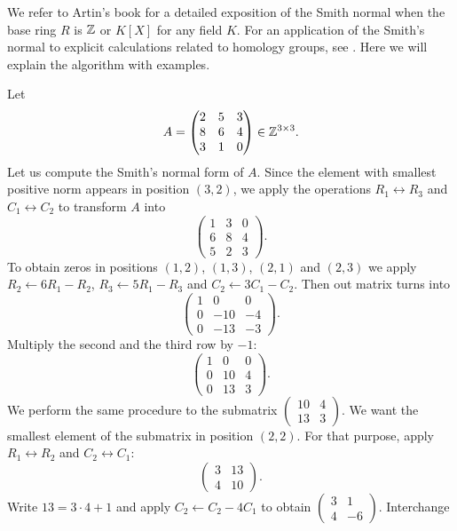 We refer to Artin's book \cite[\S14]{MR1129886} for 
a detailed exposition of the Smith normal
when the base ring $R$ is $\mathbb{Z}$ or
$K[X]$ for any field $K$. For an application 
of the Smith's normal to explicit calculations related to 
homology groups, see \cite[\S11]{MR755006}. 
Here we will explain the algorithm with examples. 

\begin{example}
Let 
\[
A=\begin{pmatrix}
	2 & 5 & 3\\
	8 & 6 & 4\\
	3 & 1 & 0
\end{pmatrix}\in\mathbb{Z}^{3\times3}.
\]	
Let us compute the Smith's normal form of $A$.
Since the element with smallest positive norm appears in position $(3,2)$,
we apply the operations $R_1\leftrightarrow R_3$ and 
$C_1\leftrightarrow C_2$ to transform $A$ into 
\[
\begin{pmatrix}
	1 & 3 & 0\\
	6 & 8 & 4\\
	5 & 2 & 3
\end{pmatrix}.
\]
To obtain zeros in positions $(1,2)$, $(1,3)$, $(2,1)$ and $(2,3)$ we 
apply 
$R_2\leftarrow 6R_1-R_2$, $R_3\leftarrow 5R_1-R_3$ and 
$C_2\leftarrow 3C_1-C_2$. Then out matrix turns into   
\[
\begin{pmatrix}
	1 & 0 & 0\\
	0 & -10 & -4\\
	0 & -13 & -3
\end{pmatrix}.
\]
Multiply the second and the third row 
by $-1$:
\[
\begin{pmatrix}
	1 & 0 & 0\\
	0 & 10 & 4\\
	0 & 13 & 3
\end{pmatrix}.
\]
We perform the same procedure to the submatrix $\begin{pmatrix}10&4\\13&3\end{pmatrix}$. 
We want the smallest element of the submatrix in position 
$(2,2)$. For that purpose, apply $R_1\leftrightarrow R_2$ and 
$C_2\leftrightarrow C_1$:
\[ 
\begin{pmatrix}
3 & 13\\
4 & 10
\end{pmatrix}.
\]
Write $13=3\cdot 4+1$ and apply 
$C_2\leftarrow C_2-4C_1$ to obtain $\begin{pmatrix}3&1\\4&-6\end{pmatrix}$. Interchange 

\end{example}
